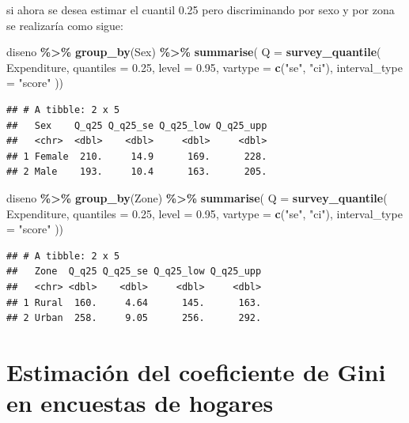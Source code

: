 \documentclass[
  12pt,
]{book}
\newenvironment{Shaded}{\begin{snugshade}}{\end{snugshade}}
\newcommand{\AttributeTok}[1]{\textcolor[rgb]{0.13,0.29,0.53}{#1}}
\newcommand{\FloatTok}[1]{\textcolor[rgb]{0.00,0.00,0.81}{#1}}
\newcommand{\FunctionTok}[1]{\textcolor[rgb]{0.13,0.29,0.53}{\textbf{#1}}}
\newcommand{\NormalTok}[1]{#1}
\newcommand{\SpecialCharTok}[1]{\textcolor[rgb]{0.81,0.36,0.00}{\textbf{#1}}}
\newcommand{\StringTok}[1]{\textcolor[rgb]{0.31,0.60,0.02}{#1}}
\begin{document}
si ahora se desea estimar el cuantil 0.25 pero discriminando por sexo y por zona se realizaría como sigue:

\begin{Shaded}
\begin{Highlighting}[]
\NormalTok{diseno }\SpecialCharTok{\%\textgreater{}\%} \FunctionTok{group\_by}\NormalTok{(Sex) }\SpecialCharTok{\%\textgreater{}\%}
  \FunctionTok{summarise}\NormalTok{(}
    \AttributeTok{Q =}  \FunctionTok{survey\_quantile}\NormalTok{(}
\NormalTok{    Expenditure,}
    \AttributeTok{quantiles =} \FloatTok{0.25}\NormalTok{,}
    \AttributeTok{level =} \FloatTok{0.95}\NormalTok{,}
    \AttributeTok{vartype =}  \FunctionTok{c}\NormalTok{(}\StringTok{"se"}\NormalTok{, }\StringTok{"ci"}\NormalTok{),}
    \AttributeTok{interval\_type =} \StringTok{"score"}
\NormalTok{   ))}
\end{Highlighting}
\end{Shaded}

\begin{verbatim}
## # A tibble: 2 x 5
##   Sex    Q_q25 Q_q25_se Q_q25_low Q_q25_upp
##   <chr>  <dbl>    <dbl>     <dbl>     <dbl>
## 1 Female  210.     14.9      169.      228.
## 2 Male    193.     10.4      163.      205.
\end{verbatim}

\begin{Shaded}
\begin{Highlighting}[]
\NormalTok{diseno }\SpecialCharTok{\%\textgreater{}\%} \FunctionTok{group\_by}\NormalTok{(Zone) }\SpecialCharTok{\%\textgreater{}\%}
  \FunctionTok{summarise}\NormalTok{(}
    \AttributeTok{Q =}  \FunctionTok{survey\_quantile}\NormalTok{(}
\NormalTok{    Expenditure,}
    \AttributeTok{quantiles =} \FloatTok{0.25}\NormalTok{,}
    \AttributeTok{level =} \FloatTok{0.95}\NormalTok{,}
    \AttributeTok{vartype =}  \FunctionTok{c}\NormalTok{(}\StringTok{"se"}\NormalTok{, }\StringTok{"ci"}\NormalTok{),}
    \AttributeTok{interval\_type =} \StringTok{"score"}
\NormalTok{   ))}
\end{Highlighting}
\end{Shaded}

\begin{verbatim}
## # A tibble: 2 x 5
##   Zone  Q_q25 Q_q25_se Q_q25_low Q_q25_upp
##   <chr> <dbl>    <dbl>     <dbl>     <dbl>
## 1 Rural  160.     4.64      145.      163.
## 2 Urban  258.     9.05      256.      292.
\end{verbatim}

\section{Estimación del coeficiente de Gini en encuestas de hogares}\label{estimaciuxf3n-del-coeficiente-de-gini-en-encuestas-de-hogares}
\end{document}
